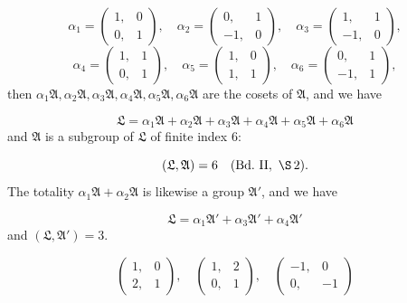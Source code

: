 \[
\alpha_1 = \begin{pmatrix}1, & 0\\ 0, & 1\end{pmatrix}, \quad \alpha_2 = \begin{pmatrix}0, & 1\\ -1, & 0\end{pmatrix}, \quad \alpha_3 = \begin{pmatrix}1, & 1\\ -1, & 0\end{pmatrix},
\]
\[
\alpha_4 = \begin{pmatrix}1, & 1\\ 0, & 1\end{pmatrix}, \quad \alpha_5 = \begin{pmatrix}1, & 0\\ 1, & 1\end{pmatrix}, \quad \alpha_6 = \begin{pmatrix}0, & 1\\ -1, & 1\end{pmatrix},
\]
then $\alpha_1\mathfrak{A}, \alpha_2\mathfrak{A}, \alpha_3\mathfrak{A}, \alpha_4\mathfrak{A}, \alpha_5\mathfrak{A}, \alpha_6\mathfrak{A}$ are the cosets of $\mathfrak{A}$, and we have

\[
\mathfrak{L} = \alpha_1\mathfrak{A} + \alpha_2\mathfrak{A} + \alpha_3\mathfrak{A} + \alpha_4\mathfrak{A} + \alpha_5\mathfrak{A} + \alpha_6\mathfrak{A}
\]
and $\mathfrak{A}$ is a subgroup of $\mathfrak{L}$ of finite index 6:

\[
(\mathfrak{L}, \mathfrak{A}) = 6 \quad (\text{Bd.\ II}, \ \S\,2).
\]
The totality $\alpha_1\mathfrak{A} + \alpha_2\mathfrak{A}$ is likewise a group $\mathfrak{A}'$, and we have

\[
\mathfrak{L} = \alpha_1\mathfrak{A}' + \alpha_3\mathfrak{A}' + \alpha_4\mathfrak{A}'
\]
and $(\mathfrak{L}, \mathfrak{A}') = 3$.


\[
\begin{pmatrix}1, & 0\\ 2, & 1\end{pmatrix}, \quad \begin{pmatrix}1, & 2\\ 0, & 1\end{pmatrix}, \quad \begin{pmatrix}-1, & 0\\ 0, & -1\end{pmatrix}
\]


